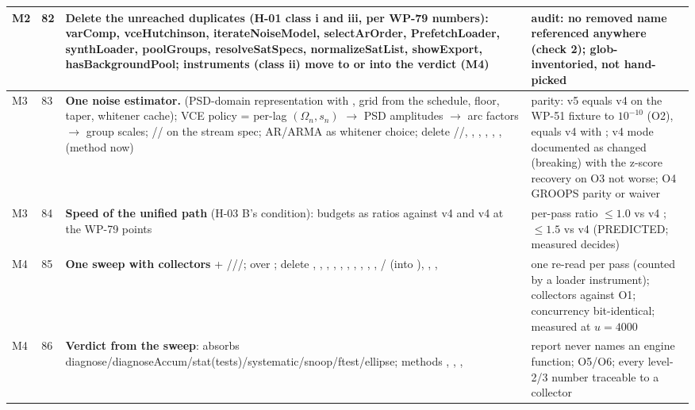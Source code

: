 \begin{longtable}{@{}P{9mm}P{9mm}P{86mm}P{50mm}@{}}
M2 & 82 & \textbf{Delete the unreached duplicates} (H-01 class i and iii, per WP-79 numbers): varComp, vceHutchinson, iterateNoiseModel, selectArOrder, PrefetchLoader, synthLoader, poolGroups, resolveSatSpecs, normalizeSatList, showExport, hasBackgroundPool; instruments (class ii) move to  or into the verdict (M4) & audit: no removed name referenced anywhere (check 2); glob-inventoried, not hand-picked\\
\midrule
M3 & 83 & \textbf{One noise estimator.}  (PSD-domain representation with , grid from the schedule, floor, taper, whitener cache);  VCE policy = per-lag $(\Omega_n, s_n)$ $\to$ PSD amplitudes $\to$ arc factors $\to$ group scales; // on the stream spec; AR/ARMA as whitener choice; delete //, , , , , ,  (method now) & parity: v5  equals v4  on the WP-51 fixture to $10^{-10}$ (O2), equals v4  with ; v4  mode documented as changed (breaking) with the z-score recovery on O3 not worse; O4 GROOPS parity or waiver\\
M3 & 84 & \textbf{Speed of the unified path} (H-03 B's condition): budgets as ratios against v4  and v4  at the WP-79 points & per-pass ratio $\le 1.0$ vs v4 ; $\le 1.5$ vs v4  (PREDICTED; measured decides)\\
\midrule
M4 & 85 & \textbf{One sweep with collectors} + ///;  over ; delete , , , , , , , , , , / (into ), , ,  & one re-read per pass (counted by a loader instrument); collectors against O1; concurrency bit-identical;  measured at $u=4000$\\
M4 & 86 & \textbf{Verdict from the sweep}:  absorbs diagnose/diagnoseAccum/stat(tests)/systematic/snoop/ftest/ellipse;  methods , , ,  & report never names an engine function; O5/O6; every level-2/3 number traceable to a collector\\

\end{longtable}
